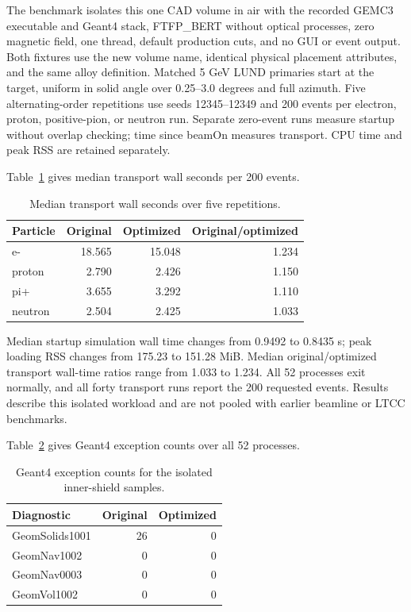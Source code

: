 The benchmark isolates this one CAD volume in air with the recorded GEMC3 executable and Geant4 stack,
FTFP\_BERT without optical processes, zero magnetic field, one thread, default production cuts, and no GUI
or event output. Both fixtures use the new volume name, identical physical placement attributes, and the
same alloy definition. Matched 5 GeV LUND primaries start at the target, uniform in solid angle over
0.25--3.0 degrees and full azimuth. Five alternating-order repetitions use seeds 12345--12349 and 200 events
per electron, proton, positive-pion, or neutron run. Separate zero-event runs measure startup without
overlap checking; time since beamOn measures transport. CPU time and peak RSS are retained separately.

Table~\ref{tab:inner-shield-timing} gives median transport wall seconds per 200 events.

\begin{table}[htbp]
\centering
\caption{Median transport wall seconds over five repetitions.}
\label{tab:inner-shield-timing}
\begin{tabular}{lrrr}
\toprule
Particle & Original & Optimized & Original/optimized \\
\midrule
e- & 18.565 & 15.048 & 1.234 \\
proton & 2.790 & 2.426 & 1.150 \\
pi+ & 3.655 & 3.292 & 1.110 \\
neutron & 2.504 & 2.425 & 1.033 \\
\bottomrule
\end{tabular}
\end{table}

Median startup simulation wall time changes from 0.9492 to 0.8435 s; peak loading RSS changes from 175.23 to
151.28 MiB. Median original/optimized transport wall-time ratios range from 1.033 to 1.234. All 52 processes
exit normally, and all forty transport runs report the 200 requested events. Results describe this isolated
workload and are not pooled with earlier beamline or LTCC benchmarks.

Table~\ref{tab:inner-shield-warnings} gives Geant4 exception counts over all 52 processes.

\begin{table}[htbp]
\centering
\caption{Geant4 exception counts for the isolated inner-shield samples.}
\label{tab:inner-shield-warnings}
\begin{tabular}{lrr}
\toprule
Diagnostic & Original & Optimized \\
\midrule
GeomSolids1001 & 26 & 0 \\
GeomNav1002 & 0 & 0 \\
GeomNav0003 & 0 & 0 \\
GeomVol1002 & 0 & 0 \\
\bottomrule
\end{tabular}
\end{table}

